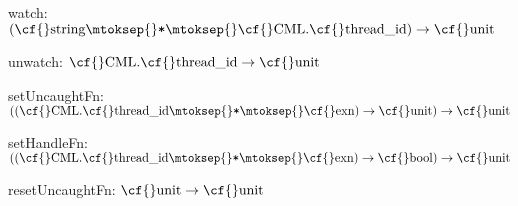\begin{interface}
\Nopagebreak
\item {}{} {\cf watch: \((\mbox{\cf{}string}\mtoksep{}\verb,*,\mtoksep{}\mbox{\cf{}CML}.\mbox{\cf{}thread\_id})\rightarrow \mbox{\cf{}unit}\)}

\Nopagebreak
\item {}{} {\cf unwatch: \(\mbox{\cf{}CML}.\mbox{\cf{}thread\_id}\rightarrow \mbox{\cf{}unit}\)}

\Nopagebreak
\item {}{} {\cf setUncaughtFn: \(((\mbox{\cf{}CML}.\mbox{\cf{}thread\_id}\mtoksep{}\verb,*,\mtoksep{}\mbox{\cf{}exn})\rightarrow \mbox{\cf{}unit})\rightarrow \mbox{\cf{}unit}\)}

\Nopagebreak
\item {}{} {\cf setHandleFn: \(((\mbox{\cf{}CML}.\mbox{\cf{}thread\_id}\mtoksep{}\verb,*,\mtoksep{}\mbox{\cf{}exn})\rightarrow \mbox{\cf{}bool})\rightarrow \mbox{\cf{}unit}\)}

\Nopagebreak
\item {}{} {\cf resetUncaughtFn: \(\mbox{\cf{}unit}\rightarrow \mbox{\cf{}unit}\)}

\end{interface}

